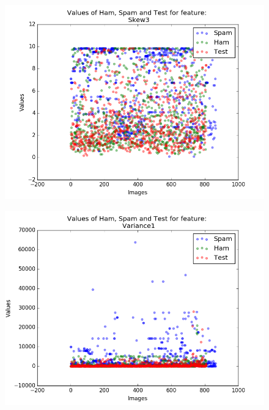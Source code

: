 \begin{figure}[h]
	\centering
	\begin{minipage}{.5\textwidth}
		\centering
		\includegraphics[width=\linewidth]{images/appA/Skew3_values_scatter}
		\label{fig:Skew3_values_scatter}
	\end{minipage}%
	\begin{minipage}{.5\textwidth}
		\centering
		\includegraphics[width=\linewidth]{images/appA/Variance1_values_scatter}
		\label{fig:Variance1_values_scatter}
	\end{minipage}
\end{figure}


